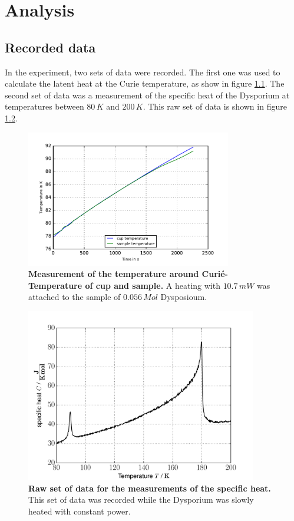 \documentclass{include/thesisclass3}
\newcommand{\e}[1]{\,\si{#1}}
\begin{document}
\chapter{Analysis}


\section{Recorded data}
In the experiment, two sets of data were recorded.
The first one was used to calculate the latent heat at the Curie temperature, as show in figure \ref{latent_raw_j}.
The second set of data was a measurement of the specific heat of the Dysporium at temperatures between $80\e{K}$ and $200\e{K}$. This raw set of data is shown in figure \ref{data}.
\begin{figure}[H]
\includegraphics[width = 0.8\textwidth]{fig/latent_raw_j.pdf}
\caption{\label{latent_raw_j}\textbf{Measurement of the temperature around Curié-Temperature of cup and sample.} A heating with $10.7\e{mW}$ was attached to the sample of $0.056\e{Mol}$ Dysposioum.}
\end{figure}
\begin{figure}[H]
\includegraphics[width = 0.9\textwidth]{fig/data.pdf}
\caption{\label{data}\textbf{Raw set of data for the measurements of the specific heat.} This set of data was recorded while the Dysporium was slowly heated with constant power.}
\end{figure}
\end{document}
